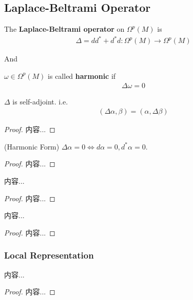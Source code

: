 \documentclass[Total.tex]{subfiles}
\begin{document}
			\subsection{Laplace-Beltrami Operator}
				\begin{Def}
					The \textbf{Laplace-Beltrami operator} on $\Omega^p(M)$ is 
					\begin{gather*}
						\Delta=dd^*+d^*d:\Omega^p(M)\rightarrow \Omega^p(M)
					\end{gather*}
				\end{Def}
				And
				\begin{Def}
					$\omega\in \Omega^p(M)$ is called \textbf{harmonic} if
					\begin{gather*}
						\Delta \omega=0
					\end{gather*}
				\end{Def}
				\begin{corollary}
					$\Delta$ is self-adjoint. i.e.
					\begin{gather*}
						(\Delta \alpha,\beta)=(\alpha,\Delta \beta)
					\end{gather*}
				\end{corollary}
				\begin{proof}
					内容...
				\end{proof}
				
				\begin{lemma}
					(Harmonic Form) $\Delta\alpha=0\Leftrightarrow d\alpha=0,d^*\alpha=0$.
				\end{lemma}
				\begin{proof}
					内容...
				\end{proof}
				
				\begin{corollary}
					内容...
				\end{corollary}
				\begin{proof}
					内容...
				\end{proof}
				
				\begin{lemma}
					内容...
				\end{lemma}
				\begin{proof}
					内容...
				\end{proof}
				\subsubsection{Local Representation}
				\begin{lemma}
					内容...
				\end{lemma}
				\begin{proof}
					内容...
				\end{proof}
				
\end{document}

